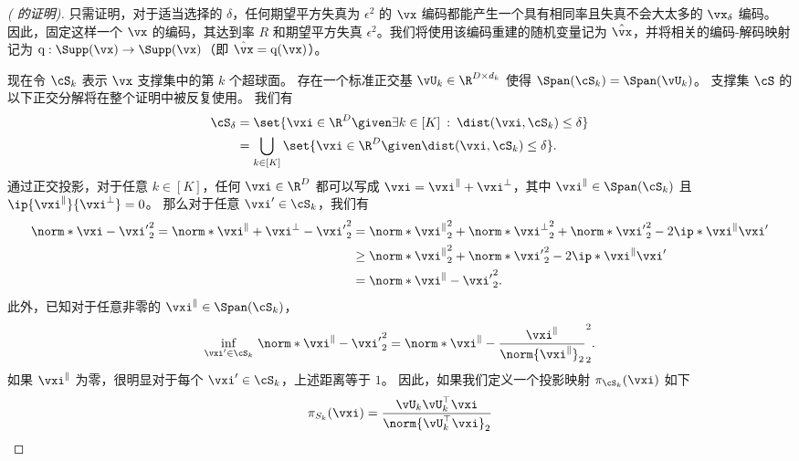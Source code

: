 \documentclass[../../book-main_zh.tex]{subfiles}
\begin{document}
\begin{proof}[( 的证明)]
    只需证明，对于适当选择的 $\delta$，任何期望平方失真为 $\epsilon^2$ 的 $\vx$ 编码都能产生一个具有相同率且失真不会大太多的 $\vx_{\delta}$ 编码。
    因此，固定这样一个 $\vx$ 的编码，其达到率 $R$ 和期望平方失真 $\epsilon^2$。我们将使用该编码重建的随机变量记为 $\hat{\vx}$，并将相关的编码-解码映射记为 $\mathrm{q} : \Supp(\vx) \to \Supp(\vx)$（即 $\hat{\vx} = \mathrm{q}(\vx)$）。

    现在令 $\cS_k$ 表示 $\vx$ 支撑集中的第 $k$ 个超球面。
    存在一个标准正交基 $\vU_{k} \in \R^{D \times d_k}$ 使得 $\Span(\cS_k) = \Span(\vU_k)$。
    支撑集 $\cS$ 的以下正交分解将在整个证明中被反复使用。
    我们有
    \begin{align}
        \cS_{\delta}
        &= \set{\vxi \in \R^D \given \exists k \in [K] \::\: \dist(\vxi,
        \cS_k) \leq \delta}
        \\
        &= \bigcup_{k \in [K]} \set{\vxi \in \R^D \given \dist(\vxi,
        \cS_k) \leq \delta}.
    \end{align}
    通过正交投影，对于任意 $k \in [K]$，任何 $\vxi \in \R^D$ 都可以写成 $\vxi = \vxi^{\|} + \vxi^{\perp}$，其中 $\vxi^{\|} \in \Span(\cS_k)$ 且 $\ip{\vxi^{\|}}{\vxi^\perp} = 0$。
    那么对于任意 $\vxi' \in \cS_k$，我们有
    \begin{align}
        \norm*{\vxi - \vxi'}_2^2
        =
        \norm*{\vxi^{\|} + \vxi^{\perp} - \vxi'}_2^2
        &=
        \norm*{\vxi^{\|}}_2^2 + \norm*{\vxi^{\perp}}_2^2 + \norm*{\vxi'}_2^2
        - 2 \ip*{\vxi^{\|}}{\vxi'}
        \\
        &\geq
        \norm*{\vxi^{\|}}_2^2 + \norm*{\vxi'}_2^2
        - 2 \ip*{\vxi^{\|}}{\vxi'}
        \\
        &=
        \norm*{\vxi^{\|} - \vxi'}_2^2.
    \end{align}
    此外，已知对于任意非零的 $\vxi^{\|} \in \Span(\cS_k)$，
    \begin{equation}
        \inf_{\vxi' \in \cS_k}\,
        \norm*{\vxi^{\|} - \vxi'}_2^2
        =
        \norm*{\vxi^{\|} - \frac{\vxi^{\|}}{\norm{\vxi^{\|}}_2}}_2^2.
    \end{equation}
    如果 $\vxi^{\|}$ 为零，很明显对于每个 $\vxi' \in \cS_k$，上述距离等于 $1$。
    因此，如果我们定义一个投影映射 $\pi_{\cS_k}(\vxi)$ 如下
    \begin{equation}
        \pi_{S_k}(\vxi) = \frac{\vU_k\vU_k^\top \vxi}{\norm{\vU_k^\top \vxi}_2}
    \end{equation}

\end{proof}
\end{document}
